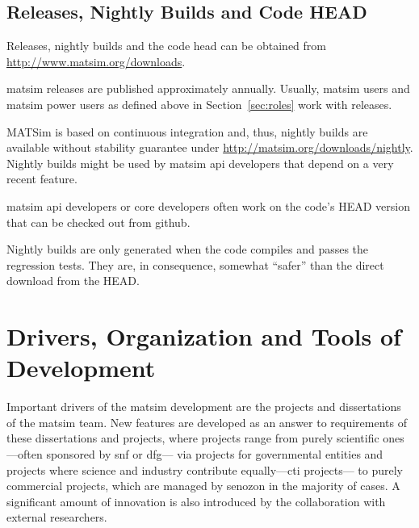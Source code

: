 \subsection{Releases, Nightly Builds and Code HEAD}
\label{sec:releases-builds}

Releases, nightly builds and the code head can be obtained 
from \url{http://www.matsim.org/downloads}.

\gls{matsim} releases are published approximately annually.
Usually, \gls{matsim} users and \gls{matsim} power users as defined above in Section~\ref{sec:roles} work with releases. 

MATSim is based on continuous integration and, thus, nightly builds are available without stability guarantee under \url{http://matsim.org/downloads/nightly}. Nightly builds might be used by \gls{matsim} \gls{api} developers that depend on a very recent feature. 

\gls{matsim} \gls{api} developers or core developers often work on the code's HEAD version that can be checked out from \gls{github}.

Nightly builds are only generated when the code compiles and passes the regression tests.  They are, in consequence, somewhat ``safer'' than the direct download from the HEAD.

\section{Drivers, Organization and Tools of Development}
Important drivers of the \gls{matsim} development are the projects and dissertations of the \gls{matsim} team. 
New features are developed as an answer to requirements of these dissertations and projects, where projects range 
%
from purely scientific ones---often sponsored by \gls{snf} or \gls{dfg}---%
%
via projects for governmental entities
%
and projects where science and industry contribute equally---\eg \gls{cti} projects---%
%
to purely 
commercial projects, which are managed by \gls{senozon} in the majority of cases. 
%
A significant amount of innovation is also introduced by the collaboration with external researchers.

